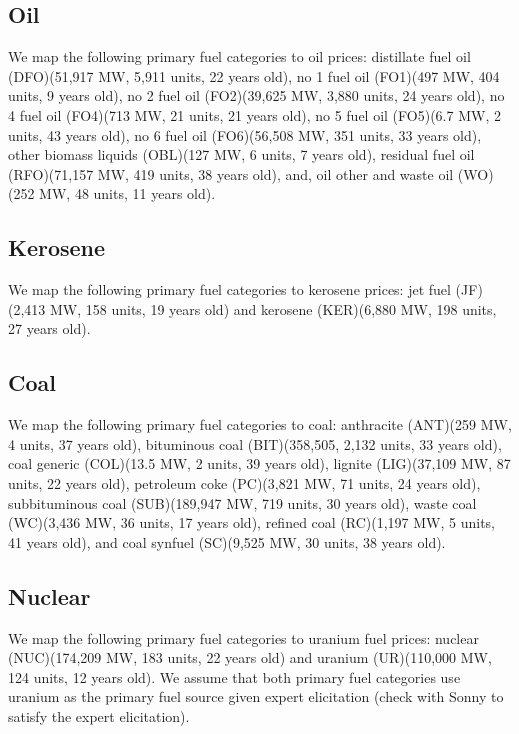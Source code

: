 \documentclass[10pt]{report}
\begin{document}
\subsection{Oil}
We map the following primary fuel categories to oil prices: distillate fuel oil (DFO)(51,917 MW, 5,911 units, 22 years old), no 1 fuel oil (FO1)(497 MW, 404 units, 9 years old), no 2 fuel oil (FO2)(39,625 MW, 3,880 units, 24 years old), no 4 fuel oil (FO4)(713 MW, 21 units, 21 years old), no 5 fuel oil (FO5)(6.7 MW, 2 units, 43 years old), no 6 fuel oil (FO6)(56,508 MW, 351 units, 33 years old), other biomass liquids (OBL)(127 MW, 6 units, 7 years old), residual fuel oil (RFO)(71,157 MW, 419 units, 38 years old), and, oil other and waste oil (WO)(252 MW, 48 units, 11 years old).

\subsection{Kerosene}
We map the following primary fuel categories to kerosene prices: jet fuel (JF)(2,413 MW, 158 units, 19 years old) and kerosene (KER)(6,880 MW, 198 units, 27 years old). 

\subsection{Coal}
We map the following primary fuel categories to coal: anthracite (ANT)(259 MW, 4 units, 37 years old), bituminous coal (BIT)(358,505, 2,132 units, 33 years old), coal generic (COL)(13.5 MW, 2 units, 39 years old), lignite (LIG)(37,109 MW, 87 units, 22 years old), petroleum coke (PC)(3,821 MW, 71 units, 24 years old), subbituminous coal (SUB)(189,947 MW, 719 units, 30 years old), waste coal (WC)(3,436 MW, 36 units, 17 years old), refined coal (RC)(1,197 MW, 5 units, 41 years old), and coal synfuel (SC)(9,525 MW, 30 units, 38 years old). 

\subsection{Nuclear}
We map the following primary fuel categories to uranium fuel prices: nuclear (NUC)(174,209 MW, 183 units, 22 years old) and uranium (UR)(110,000 MW, 124 units, 12 years old). 
We assume that both primary fuel categories use uranium as the primary fuel source given expert elicitation (check with Sonny to satisfy the expert elicitation).
\end{document}

